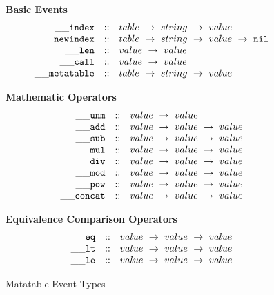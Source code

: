 \documentclass{article}
\begin{document}
\begin{figure}[P]
\caption{Matatable Event Types}
{\bf Basic Events}
\label{fig:FW2.1hooks}
\[
\begin{array}{rclcl}
  {\tt \_\_index} & :: & {table} ~\rightarrow ~ {string} ~\rightarrow ~ {value} \\
  {\tt \_\_newindex}   & :: &  {table} ~\rightarrow ~{string} ~\rightarrow ~{value} ~\rightarrow ~{\tt nil}\\
  {\tt \_\_len}   & :: &  {value} ~\rightarrow ~{value}\\
  {\tt \_\_call}   & :: &  {value} ~\rightarrow ~{value}\\
  {\tt \_\_metatable}   & :: &  {table} ~\rightarrow ~{string} ~\rightarrow ~{value}\\
\end{array}
\]

{\bf Mathematic Operators}
\[
\begin{array}{rclcl}
  {\tt \_\_unm} & :: &  {value} ~\rightarrow ~{value}\\
  {\tt \_\_add}   & :: &  {value} ~\rightarrow ~{value}~\rightarrow ~{value}\\
  {\tt \_\_sub}   & :: &  {value} ~\rightarrow ~{value}~\rightarrow ~{value}\\
  {\tt \_\_mul}   & :: &  {value} ~\rightarrow ~{value}~\rightarrow ~{value}\\
  {\tt \_\_div}   & :: &  {value} ~\rightarrow ~{value}~\rightarrow ~{value}\\
  {\tt \_\_mod}   & :: &  {value} ~\rightarrow ~{value}~\rightarrow ~{value}\\
  {\tt \_\_pow}   & :: &  {value} ~\rightarrow ~{value}~\rightarrow ~{value}\\
  {\tt \_\_concat}   & :: &  {value} ~\rightarrow ~{value}~\rightarrow ~{value}\\
\end{array}
\]

{\bf Equivalence Comparison Operators}
\[
\begin{array}{rclcl}
  {\tt \_\_eq} & :: & {value} ~\rightarrow ~ {value} ~\rightarrow ~ {value}\\
  {\tt \_\_lt}   & :: &  {value} ~\rightarrow ~{value} ~\rightarrow ~{value}\\
  {\tt \_\_le}   & :: &  {value} ~\rightarrow ~{value} ~\rightarrow ~{value}\\
\end{array}
\]
\end{figure}
\end{document}
